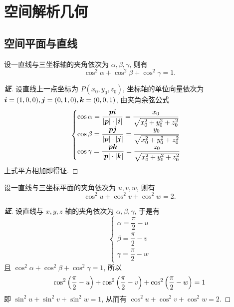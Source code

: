 \section{空间解析几何}

\subsection{空间平面与直线}

\begin{theorem}[线轴夹角余弦平方和公式]
    设一直线与三坐标轴的夹角依次为 $\alpha,\beta,\gamma$, 则有 $$\cos^2\alpha+\cos^2\beta+\cos^2\gamma=1.$$
\end{theorem}
\begin{proof}[{\songti \textbf{证}}]
    设直线上一点坐标为 $P(x_0,y_0,z_0)$, 坐标轴的单位向量依次为 $\vb*{i}=(1,0,0),\vb*{j}=(0,1,0),\vb*{k}=(0,0,1)$, 由夹角余弦公式
    $$\begin{cases}
            \cos\alpha=\dfrac{\vb*{pi}}{|\vb*{p}|\cdot|\vb*{i}|}=\dfrac{x_0}{\sqrt{x_0^2+y_0^2+z_0^2}} \\
            \cos\beta=\dfrac{\vb*{pj}}{|\vb*{p}|\cdot|\vb*{j}|}=\dfrac{y_0}{\sqrt{x_0^2+y_0^2+z_0^2}}  \\
            \cos\gamma=\dfrac{\vb*{pk}}{|\vb*{p}|\cdot|\vb*{k}|}=\dfrac{z_0}{\sqrt{x_0^2+y_0^2+z_0^2}} \\
        \end{cases}
    $$
    上式平方相加即得证.
\end{proof}

\begin{theorem}[线面夹角余弦平方和公式]
    设一直线与三坐标平面的夹角依次为 $u,v,w$, 则有 $$\cos^2u+\cos^2v+\cos^2w=2.$$
\end{theorem}
\begin{proof}[{\songti \textbf{证}}]
    设直线与 $x,y,z$ 轴的夹角依次为 $\alpha,\beta,\gamma$, 于是有
    $$\begin{cases}
            \alpha=\dfrac{\pi}{2}-u \\[6pt]\beta=\dfrac{\pi}{2}-v\\[6pt]\gamma=\dfrac{\pi}{2}-w
        \end{cases}$$
    且 $\cos^2\alpha+\cos^2\beta+\cos^2\gamma=1$, 所以
    $$\cos^2\qty(\dfrac{\pi}{2}-u)+\cos^2\qty(\dfrac{\pi}{2}-v)+\cos^2\qty(\dfrac{\pi}{2}-w)=1$$
    即 $\sin^2u+\sin^2v+\sin^2w=1$, 从而有 $\cos^2u+\cos^2v+\cos^2w=2.$
\end{proof}

